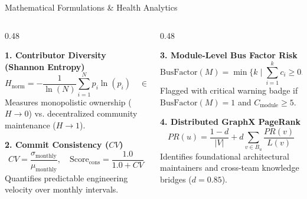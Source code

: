 \documentclass[aspectratio=169, 10pt]{beamer}
\begin{document}
\begin{frame}{Mathematical Formulations \& Health Analytics}
  \begin{columns}[T]
    \begin{column}{0.48\textwidth}
      \begin{block}{\textbf{1. Contributor Diversity (Shannon Entropy)}}
        \vspace{-0.1cm}
        $$H_{\text{norm}} = -\frac{1}{\ln(N)} \sum_{i=1}^{N} p_i \ln(p_i) \quad \in [0.0, 1.0]$$
        Measures monopolistic ownership ($H \to 0$) vs. decentralized community maintenance ($H \to 1$).
      \end{block}
      
      \begin{block}{\textbf{2. Commit Consistency ($CV$)}}
        \vspace{-0.1cm}
        $$CV = \frac{\sigma_{\text{monthly}}}{\mu_{\text{monthly}}}, \quad \text{Score}_{\text{cons}} = \frac{1.0}{1.0 + CV}$$
        Quantifies predictable engineering velocity over monthly intervals.
      \end{block}
    \end{column}

    \begin{column}{0.48\textwidth}
      \begin{alertblock}{\textbf{3. Module-Level Bus Factor Risk}}
        \vspace{-0.1cm}
        $$\text{BusFactor}(M) = \min \{ k \mid \sum_{i=1}^{k} c_i \ge 0.50 \cdot C_{\text{module}} \}$$
        Flagged with critical warning badge if $\text{BusFactor}(M) = 1$ and $C_{\text{module}} \ge 5$.
      \end{alertblock}

      \begin{exampleblock}{\textbf{4. Distributed GraphX PageRank}}
        \vspace{-0.1cm}
        $$PR(u) = \frac{1 - d}{|V|} + d \sum_{v \in B_u} \frac{PR(v)}{L(v)}$$
        Identifies foundational architectural maintainers and cross-team knowledge bridges ($d=0.85$).
      \end{exampleblock}
    \end{column}
  \end{columns}
\end{frame}
\end{document}
